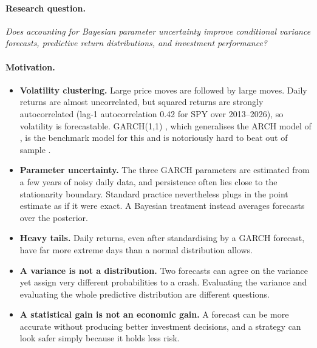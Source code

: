 \documentclass[11pt]{article}
\begin{document}
\paragraph{Research question.} \emph{Does accounting for Bayesian parameter uncertainty improve conditional variance
forecasts, predictive return distributions, and investment performance?}

\paragraph{Motivation.}
\begin{itemize}
\item \textbf{Volatility clustering.} Large price moves are followed by large moves. Daily returns are almost
uncorrelated, but squared returns are strongly autocorrelated (lag-1 autocorrelation 0.42 for SPY over 2013--2026), so
volatility is forecastable. GARCH(1,1) \cite{bollerslev1986}, which generalises the ARCH model of \citet{engle1982}, is the benchmark model for this and is notoriously hard
to beat out of sample \cite{hansenlunde2005}.
\item \textbf{Parameter uncertainty.} The three GARCH parameters are estimated from a few years of noisy daily data,
and persistence often lies close to the stationarity boundary. Standard practice nevertheless plugs in the point
estimate as if it were exact. A Bayesian treatment \cite{ardia2008} instead averages forecasts over the posterior.
\item \textbf{Heavy tails.} Daily returns, even after standardising by a GARCH forecast, have far more extreme days
than a normal distribution allows.
\item \textbf{A variance is not a distribution.} Two forecasts can agree on the variance yet assign very different
probabilities to a crash. Evaluating the variance and evaluating the whole predictive distribution are different questions.
\item \textbf{A statistical gain is not an economic gain.} A forecast can be more accurate without producing better
investment decisions, and a strategy can look safer simply because it holds less risk.
\end{itemize}
\end{document}
